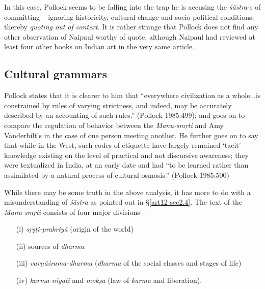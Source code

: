 In this case, Pollock seems to be falling into the trap he is accusing the {\sl śāstra}-s of committing -- ignoring historicity, cultural change and socio-political conditions; thereby {\sl quoting out of context}. It is rather strange that Pollock does not ﬁnd any other observation of Naipaul worthy of quote, although Naipaul had reviewed at least four other books on Indian art in the very same article.

\subsection{Cultural grammars}\label{art12-sec3.3}

Pollock states that it is clearer to him that ``everywhere civilization as a whole...is constrained by rules of varying strictness, and indeed, may be accurately described by an accounting of such rules.'' (Pollock 1985:499); and goes on to compare the regulation of behavior between the {\sl Manu-smṛti} and Amy Vanderbilt's in the case of one person meeting another. He further goes on to say that while in the West, such codes of etiquette have largely remained `tacit' knowledge existing on the level of practical and not discursive awareness; they were textualized in India, at an early date and had ``to be learned rather than assimilated by a natural process of cultural osmosis.'' (Pollock 1985:500) 

While there may be some truth in the above analysis, it has more to do with a misunderstanding of {\sl śāstra} as pointed out in \S\ref{art12-sec2.4}. The text of the {\sl Manu-smṛti} consists of four major divisions ---
\begin{itemize}
\itemsep=1pt
\item[(i)] {\sl sṛṣṭi-prakriyā} (origin of the world)

\item[(ii)] sources of {\sl dharma}

\item[(iii)] {\sl varṇāśrama-dharma} ({\sl dharma} of the social classes and stages of life)

\item[(iv)] {\sl karma-niyati} and {\sl mokṣa} (law of {\sl karma} and liberation).
\end{itemize}

